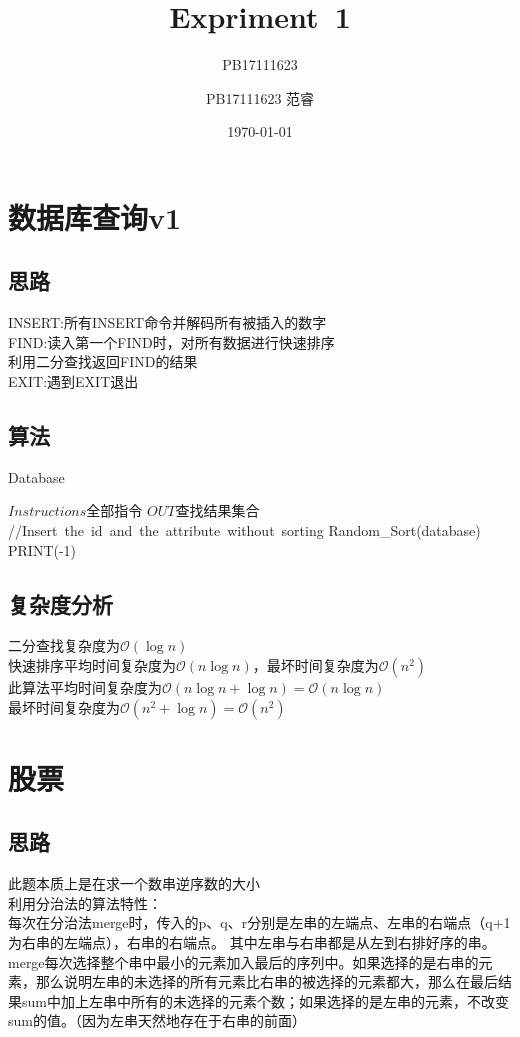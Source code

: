 \documentclass[UTF8]{ctexart}
\title{Expriment\ 1}
\author{PB17111623}
\author{PB17111623 范睿}
\date{\today}
\begin{document}
\maketitle
\section{数据库查询v1}
\subsection{思路}
INSERT: 所有INSERT命令并解码所有被插入的数字\\
FIND:\quad 读入第一个FIND时，对所有数据进行快速排序\\
利用二分查找返回FIND的结果\\
EXIT:\quad 遇到EXIT退出
\subsection{算法}
\renewcommand{\algorithmicrequire}{\textbf{输入:}}
\renewcommand{\algorithmicensure}{\textbf{输出:}}
\begin{algorithm}
	\caption{Database}
	\begin{algorithmic}
	\Require $Instructions$全部指令
	\Ensure $OUT$查找结果集合
		\State //Insert\ the\ id\ and\ the\ attribute\ without\ sorting
				\State Random\_Sort(database)
			\EndIf
				\State PRINT(-1)
			\EndIf
		\EndIf
		
	\EndWhile
	\end{algorithmic}
\end{algorithm}
\subsection{复杂度分析}
二分查找复杂度为{$\mathcal{O}(\log n)$}\\
快速排序平均时间复杂度为{$\mathcal{O}(n\log n)$}，最坏时间复杂度为{$\mathcal{O}(n^2)$}\\
此算法平均时间复杂度为{$\mathcal{O}(n\log n+\log n)=\mathcal{O}(n\log n)$}\\
最坏时间复杂度为{$\mathcal{O}(n^2+\log n)=\mathcal{O}(n^2)$}
\newpage
\section{股票}
\subsection{思路}
此题本质上是在求一个数串逆序数的大小\\
利用分治法的算法特性：\\
每次在分治法merge时，传入的p、q、r分别是左串的左端点、左串的右端点（q+1为右串的左端点），右串的右端点。
其中左串与右串都是从左到右排好序的串。\\
merge每次选择整个串中最小的元素加入最后的序列中。如果选择的是右串的元素，那么说明左串的未选择的所有元素比右串的被选择的元素都大，那么在最后结果sum中加上左串中所有的未选择的元素个数；如果选择的是左串的元素，不改变sum的值。（因为左串天然地存在于右串的前面）
\end{document}
